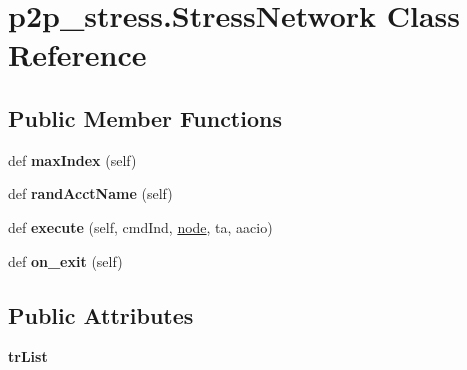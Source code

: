 \hypertarget{classp2p__stress_1_1_stress_network}{}\section{p2p\+\_\+stress.\+Stress\+Network Class Reference}
\label{classp2p__stress_1_1_stress_network}
\subsection*{Public Member Functions}
\begin{DoxyCompactItemize}
\item 
\mbox{\label{classp2p__stress_1_1_stress_network_a217e792d94a9620d3690c0c02a404f2f}} 
def {\bfseries max\+Index} (self)
\item 
\mbox{\label{classp2p__stress_1_1_stress_network_af15077219a521a8159a9ba54b765191f}} 
def {\bfseries rand\+Acct\+Name} (self)
\item 
\mbox{\label{classp2p__stress_1_1_stress_network_a803241cedecf961bd59f2cfcc1e723aa}} 
def {\bfseries execute} (self, cmd\+Ind, \mbox{\hyperlink{structnode}{node}}, ta, aacio)
\item 
\mbox{\label{classp2p__stress_1_1_stress_network_a7fcd8d3cce4ffa7ad2fd27f163f41cc5}} 
def {\bfseries on\+\_\+exit} (self)
\end{DoxyCompactItemize}
\subsection*{Public Attributes}
\begin{DoxyCompactItemize}
\item 
\mbox{\label{classp2p__stress_1_1_stress_network_a86ce8e4fe061e9e4cc834f9d53935e9d}} 
{\bfseries tr\+List}
\end{DoxyCompactItemize}
